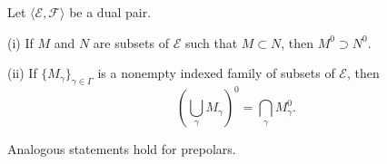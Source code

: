Let $\langle \mathcal{E}, \mathcal{F} \rangle$ be a dual pair.

(i) If $M$ and $N$ are subsets of $\mathcal{E}$ such that $M \subset N$, then $M^0 \supset N^0$.

(ii) If $\{M_\gamma\}_{\gamma \in \Gamma}$ is a nonempty indexed family of subsets of $\mathcal{E}$, then
$$\left( \bigcup_{\gamma} M_\gamma \right)^0 = \bigcap_{\gamma} M_\gamma^0.$$

Analogous statements hold for prepolars.
